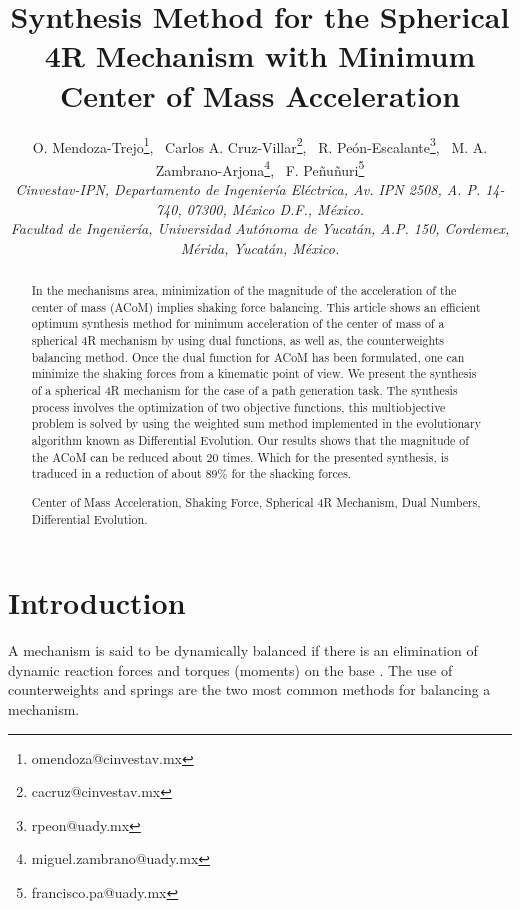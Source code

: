 \documentclass[11pt]{article}
\providecommand{\keywords}[1]{\noindent{\textbf{\textit{Keywords---}}} #1}
\begin{document}
\title{Synthesis Method for the Spherical 4R Mechanism with Minimum 
Center of Mass Acceleration}

\author{{\small
O. Mendoza-Trejo\footnote{omendoza@cinvestav.mx},~
Carlos A. Cruz-Villar\footnote{cacruz@cinvestav.mx},~ 
R. Pe\'on-Escalante\footnote{rpeon@uady.mx},~
M. A. Zambrano-Arjona\footnote{miguel.zambrano@uady.mx},~
F. Pe\~nu\~nuri\footnote{francisco.pa@uady.mx}}\\
{\footnotesize \textit{Cinvestav-IPN, Departamento de Ingenier\'ia 
El\'ectrica, Av. IPN 2508, A. P. 14-740, 07300, M\'e\-xi\-co D.F., 
M\'exico.}}\\
{\footnotesize \textit{Facultad de Ingenier\'ia, Universidad 
Aut\'onoma de Yucat\'an, A.P. 150, Cordemex, M\'erida, Yucat\'an, 
M\'exico.}}
}
\date{}
\maketitle
\begin{abstract}
In the mechanisms area, minimization of the magnitude of the 
acceleration of the center of mass (ACoM) implies shaking force 
balancing.  This article shows an efficient optimum 
synthesis method for minimum acceleration of the center of mass of a 
spherical 4R mechanism by using dual functions, as well as, the 
counterweights balancing method. Once the dual function for ACoM has 
been formulated, one can minimize the shaking forces from a kinematic 
point of view. We present the synthesis of a spherical 4R mechanism for 
the case of a path generation task. The synthesis process involves the 
optimization of two objective functions, this multiobjective problem is 
solved by using the weighted sum method implemented in the evolutionary 
algorithm known as Differential Evolution. Our results shows that the
magnitude of the ACoM can be reduced about 20 times. Which for the 
presented synthesis, is traduced in a reduction of about 89\% for the 
shacking forces.

\vspace*{0.25cm}
\keywords{Center of Mass Acceleration, Shaking Force, Spherical 4R 
Mechanism, Dual Numbers, Differential Evolution.}
\end{abstract}

\section{Introduction}
A mechanism is said to be dynamically balanced if there is 
an elimination of dynamic reaction forces  and torques (moments) on the 
base \cite{Gosselin2004,Qimi2010,Wijk2009,Wijk2013}.
The use of counterweights \cite{Bagci1982,Feng1990,Smith1999,
Schutter2006} and springs \cite{Gosselin1999, Agrawal2005, Deepak2012} 
are the two most common methods for balancing a mechanism.
\end{document}
